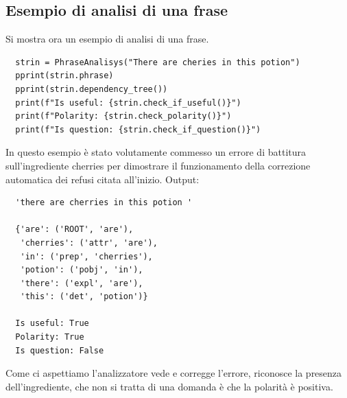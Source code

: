 \subsection{Esempio di analisi di una frase}
Si mostra ora un esempio di analisi di una frase.
\begin{lstlisting}
  strin = PhraseAnalisys("There are cheries in this potion")
  pprint(strin.phrase)
  pprint(strin.dependency_tree())
  print(f"Is useful: {strin.check_if_useful()}")
  print(f"Polarity: {strin.check_polarity()}")
  print(f"Is question: {strin.check_if_question()}")
\end{lstlisting}
In questo esempio è stato volutamente commesso un errore di battitura sull'ingrediente cherries per dimostrare il funzionamento della correzione automatica dei refusi citata all'inizio.
\newline
\newline
Output:
\begin{lstlisting}
  'there are cherries in this potion '

  {'are': ('ROOT', 'are'),
   'cherries': ('attr', 'are'),
   'in': ('prep', 'cherries'),
   'potion': ('pobj', 'in'),
   'there': ('expl', 'are'),
   'this': ('det', 'potion')}

  Is useful: True
  Polarity: True
  Is question: False
\end{lstlisting}

Come ci aspettiamo l'analizzatore vede e corregge l'errore, riconosce la presenza dell'ingrediente, che non si tratta di una domanda è che la polarità è positiva.